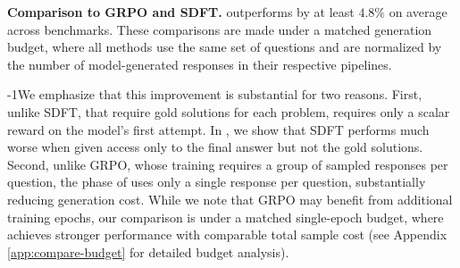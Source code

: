 
\textbf{Comparison to GRPO and SDFT.}  \ours{} outperforms by at least $4.8\%$ on average across benchmarks. These comparisons are made under a matched generation budget, where all methods use the same set of questions and are normalized by the number of model-generated responses in their respective pipelines.


\looseness-1We emphasize that this improvement is substantial for two reasons. First, unlike SDFT, that require gold solutions for each problem, \ours{} requires only a scalar reward on the model’s first attempt. In , we show that SDFT performs much worse when given access only to the final answer but not the gold solutions. 
Second, unlike GRPO, whose training requires a group of sampled responses per question, the \opsd{} phase of \ours{} uses only a single response per question, substantially reducing generation cost.
While we note that GRPO may benefit from additional training epochs, our comparison is under a matched single-epoch budget, where \ours{} achieves stronger performance with comparable total sample cost (see Appendix \ref{app:compare-budget} for detailed budget analysis).




